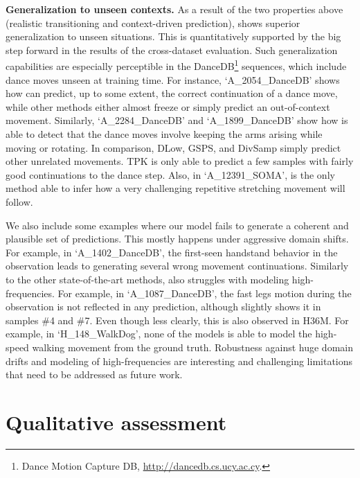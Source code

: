 \documentclass[10pt,twocolumn,letterpaper]{article}
\begin{document}
\textbf{Generalization to unseen contexts. } As a result of the two properties above (realistic transitioning and context-driven prediction), \modelname{} shows superior generalization to unseen situations. This is quantitatively supported by the big step forward in the results of the cross-dataset evaluation. Such generalization capabilities are especially perceptible in the DanceDB\footnote{Dance Motion Capture DB, \url{http://dancedb.cs.ucy.ac.cy}.} sequences, which include dance moves unseen at training time. For instance, `A\_2054\_DanceDB' shows how \modelname{} can predict, up to some extent, the correct continuation of a dance move, while other methods either almost freeze or simply predict an out-of-context movement. Similarly, `A\_2284\_DanceDB' and `A\_1899\_DanceDB' show how \modelname{} is able to detect that the dance moves involve keeping the arms arising while moving or rotating. In comparison, DLow, GSPS, and DivSamp simply predict other unrelated movements. TPK is only able to predict a few samples with fairly good continuations to the dance step. Also, in `A\_12391\_SOMA', \modelname{} is the only method able to infer how a very challenging repetitive stretching movement will follow.

We also include some examples where our model fails to generate a coherent and plausible set of predictions. This mostly happens under aggressive domain shifts. For example, in `A\_1402\_DanceDB', the first-seen handstand behavior in the observation leads to \modelname{} generating several wrong movement continuations. Similarly to the other state-of-the-art methods, \modelname{} also struggles with modeling high-frequencies. For example, in `A\_1087\_DanceDB', the fast legs motion during the observation is not reflected in any prediction, although \modelname{} slightly shows it in samples \#4 and \#7. Even though less clearly, this is also observed in H36M. For example, in `H\_148\_WalkDog', none of the models is able to model the high-speed walking movement from the ground truth. Robustness against huge domain drifts and modeling of high-frequencies are interesting and challenging limitations that need to be addressed as future work.



 \section{Qualitative assessment}
\label{sec:supp_mos}
\end{document}
